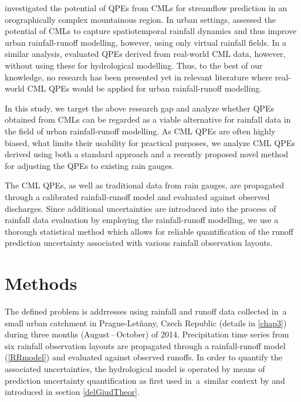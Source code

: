 \documentclass{ctuthesis}\usepackage[]{graphicx}\usepackage[]{color}
\begin{document}
\cite{smiatekPotentialCommercialMicrowave2017} investigated the potential of QPEs from CMLs for streamflow prediction in an orographically complex mountainous region. In urban settings,  \cite{fencl2013assessing} assessed the potential of CMLs to capture spatiotemporal rainfall dynamics and thus improve urban rainfall-runoff modelling, however, using only  virtual rainfall fields. In a similar analysis, \cite{fenclCommercialMicrowaveLinks2015} evaluated QPEs derived from real-world CML data, however, without using these for hydrological modelling. Thus, to the best of our knowledge, no research has been presented yet in relevant literature where real-world CML QPEs would be applied for urban rainfall-runoff modelling. 

In this study, we target the above research gap and analyze whether QPEs obtained from CMLs can be regarded as a viable alternative for rainfall data in the field of urban rainfall-runoff modelling. As CML QPEs are often highly biased, what limits their usability for practical purposes, we analyze CML QPEs derived using both a standard approach and a recently proposed \citep{fenclGaugeadjustedRainfallEstimates2017} novel method for adjusting the QPEs to existing rain gauges. 

The CML QPEs, as well as traditional data from rain gauges, are propagated through a calibrated rainfall-runoff model and evaluated against observed discharges. Since additional uncertainties are introduced into the process of rainfall data evaluation by employing the rainfall-runoff modelling, we use a thorough statistical method which allows for reliable quantification of the runoff prediction uncertainty associated with various rainfall observation layouts. 

 
\section{Methods} \label{pilotMnM}

The defined problem is addrresses using rainfall and runoff data collected in~a small urban catchment in Prague-Letňany, Czech Republic (details in \ref{chap3}) during three months (August\,--\,October) of 2014. Precipitation time series from six rainfall observation layouts are propagated through a rainfall-runoff model (\ref{RRmodel}) and evaluated against observed runoffs. In order to quantify the associated uncertainties, the hydrological model is operated by means of prediction uncertainty quantification as first used in~a~similar context by \cite{giudice2013improving} and introduced in section \ref{delGiudTheor}.
\end{document}

